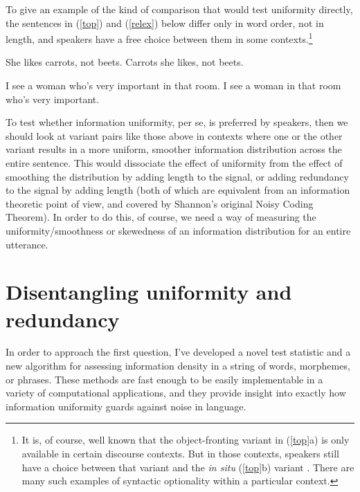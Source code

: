 \documentclass[12pt]{article}
\begin{document}
To give an example of the kind of comparison that would test uniformity directly, the sentences in (\ref{top}) and (\ref{relex}) below differ only in word order, not in length, and speakers have a free choice between them in some contexts.\footnote{It is, of course, well known that the object-fronting variant in (\ref{top}a) is only available in certain discourse contexts. But in those contexts, speakers still have a choice between that variant and the \textsl{in situ} (\ref{top}b) variant \citep{prince1998, prince1999}. There are many such examples of syntactic optionality within a particular context.} 

\begin{exe}
	\ex \label{top} \begin{xlist} \ex She likes carrots, not beets.
		\ex Carrots she likes, not beets.
		\end{xlist}
	\ex \label{relex} \begin{xlist}
		\ex I see a woman who's very important in that room.
		\ex I see a woman in that room who's very important.
	\end{xlist}
\end{exe}

\noindent To test whether information uniformity, per se, is preferred by speakers, then we should look at variant pairs like those above in contexts where one or the other variant results in a more uniform, smoother information distribution across the entire sentence. This would dissociate the effect of uniformity from the effect of smoothing the distribution by adding length to the signal, or adding redundancy to the signal by adding length (both of which are equivalent from an information theoretic point of view, and covered by Shannon's original Noisy Coding Theorem). In order to do this, of course, we need a way of measuring the uniformity/smoothness or skewedness of an information distribution for an entire utterance.



\section{Disentangling uniformity and redundancy}
\label{disentangle}

In order to approach the first question, I've developed a novel test statistic and a new algorithm for assessing information density in a string of words, morphemes, or phrases. These methods are fast enough to be easily implementable in a variety of computational applications, and they provide insight into exactly how information uniformity guards against noise in language.
\end{document}
